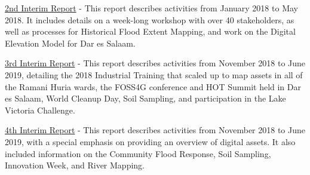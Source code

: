 \documentclass[a4paper,12pt,twoside]{article}
\begin{document}
\href{https://drive.google.com/file/d/1_9KBaV5TFkYzJNMKJNYB2UE3tlb7lD8_/view?usp=sharing}{2nd Interim Report} -
This report describes activities from January 2018 to May 2018. It includes details on a week-long workshop with over 40 stakeholders, as well as processes for Historical Flood Extent Mapping, and work on the Digital Elevation Model for Dar es Salaam. 

\href{https://drive.google.com/file/d/1wApcpb2gFHxQizMs0L7RebiUqJmrojVM/view?usp=sharing}{3rd Interim Report} -
This report describes activities from November 2018 to June 2019, detailing the 2018 Industrial Training that scaled up to map assets in all of the Ramani Huria wards, the FOSS4G conference and HOT Summit held in Dar es Salaam, World Cleanup Day, Soil Sampling, and participation in the Lake Victoria Challenge. 

\href{https://drive.google.com/file/d/1-12RsrqFy65i8VlozS9t1D7XW7iDipAD/view?usp=sharing}{4th Interim Report} -
This report describes activities from November 2018 to June 2019, with a special emphasis on providing an overview of digital assets. It also included information on the Community Flood Response, Soil Sampling, Innovation Week, and River Mapping. 

\newpage
\thispagestyle{empty}
\clearpage
\end{document}
